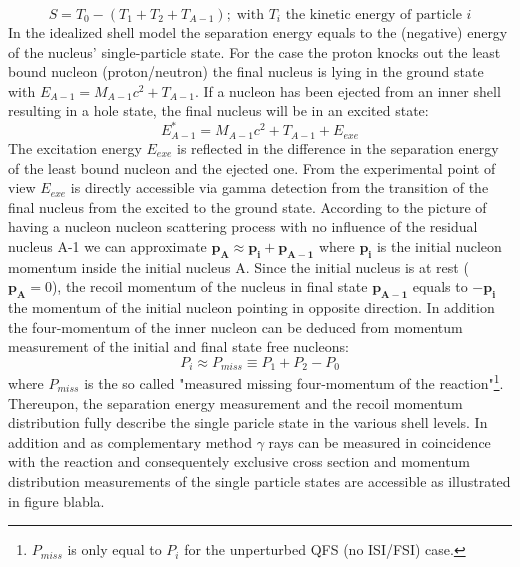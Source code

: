 \begin{equation}
S = T_0 -(T_1+T_2 +T_{A-1}); \; \text{with $T_i$ the kinetic energy of particle $i$} 
\label{eq:sep_e}
\end{equation}
In the idealized shell model the separation energy equals to the (negative) energy of the nucleus' single-particle state. For the case the proton knocks out the least bound nucleon (proton/neutron) the final nucleus is lying in the ground state with $E_{A-1} = M_{A-1}c^2  + T_{A-1}$.\newline
If a nucleon has been ejected from an inner shell resulting in a hole state, the final nucleus will be in an excited state:
\begin{equation}
E^{*}_{A-1} =  M_{A-1}c^2  +T_{A-1} + E_{exe}
\end{equation} 
The excitation energy $E_{exe}$ is reflected in the difference in the separation energy of the least bound nucleon and the ejected one. From the experimental point of view $E_{exe}$ is directly accessible via gamma detection from the transition of the final nucleus from the excited to the ground state. 
According to the picture of having a nucleon nucleon scattering process with no influence of the residual nucleus A-1 we can approximate $\mathbf{p_A} \approx \mathbf{p_i} + \mathbf{p_{A-1}}$ where $\mathbf{p_i}$ is the initial nucleon momentum inside the initial nucleus A. Since the initial nucleus is at rest ($\mathbf{p_A} = 0$), the recoil momentum of the nucleus in final state $\mathbf{p_{A-1}}$ equals to $-\mathbf{p_i}$ the momentum of the initial nucleon pointing in opposite direction. \newline
In addition the four-momentum of the inner nucleon can be deduced from momentum measurement of the initial and final state free nucleons:
\begin{equation}\label{eq:miss_mom}
P_i \approx P_{miss} \equiv P_1 + P_2  - P_0
\end{equation}
where $P_{miss}$ is the so called "measured missing four-momentum of the reaction"\cite{patsyuk2021unperturbed}\footnote{$P_{miss}$ is only equal to $P_i$ for the unperturbed QFS (no ISI/FSI) case.}.
Thereupon, the separation energy measurement and the recoil momentum distribution fully describe the single paricle state in the various shell levels. 
In addition and as complementary method $\gamma$ rays can be measured in coincidence with the reaction and consequentely exclusive cross section and momentum distribution measurements of the single particle states are accessible as illustrated in figure blabla.\newline
